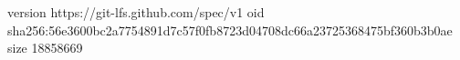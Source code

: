 version https://git-lfs.github.com/spec/v1
oid sha256:56e3600bc2a7754891d7c57f0fb8723d04708dc66a23725368475bf360b3b0ae
size 18858669
